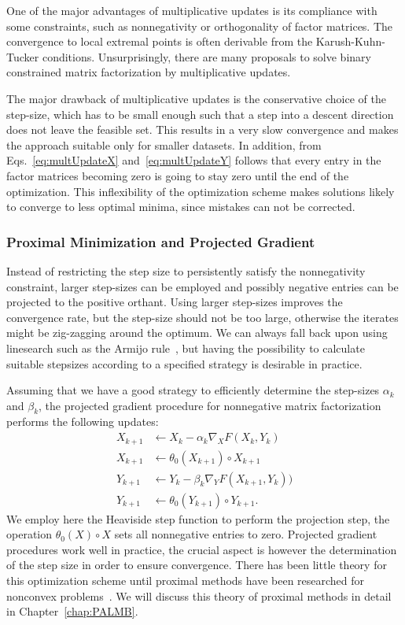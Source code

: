One of the major advantages of multiplicative updates is its compliance with some constraints, such as nonnegativity or orthogonality of factor matrices. The  convergence to local extremal points is often derivable from the Karush-Kuhn-Tucker conditions. Unsurprisingly, there are many proposals to solve binary constrained matrix factorization by multiplicative updates.  

The major drawback of multiplicative updates is the conservative choice of the step-size, which has to be small enough such that a step into a descent direction does not leave the feasible set. This results in a very slow convergence and makes the approach suitable only for smaller datasets. In addition, from Eqs.~\eqref{eq:multUpdateX} and~\eqref{eq:multUpdateY} follows that every entry in the factor matrices becoming zero is going to stay zero until the end of the optimization. This inflexibility of the optimization scheme makes solutions likely to converge to less optimal minima, since mistakes can not be corrected. 
%
\subsubsection{Proximal Minimization and Projected Gradient} \label{sec:ZS:ProxNMF}
Instead of restricting the step size to persistently satisfy the nonnegativity constraint, larger step-sizes can be employed and possibly negative entries can be projected to the positive orthant. Using larger step-sizes improves the convergence rate, but the step-size should not be too large, otherwise the iterates might be zig-zagging around the optimum. We can always fall back upon using linesearch such as the Armijo rule~\citep{lin2007projected}, but having the possibility to calculate suitable stepsizes according to a specified strategy is desirable in practice.  

Assuming that we have a good strategy to efficiently determine the step-sizes $\alpha_k$ and $\beta_k$, the projected gradient procedure for nonnegative matrix factorization performs the following updates:
\begin{align*}
X_{k+1}&\gets X_k-\alpha_k\nabla_XF(X_k,Y_k) \\
X_{k+1}&\gets \theta_0(X_{k+1})\circ X_{k+1}\\
Y_{k+1}&\gets Y_k-\beta_k\nabla_YF(X_{k+1},Y_k))\\
Y_{k+1}&\gets \theta_0(Y_{k+1})\circ Y_{k+1}.
\end{align*}
We employ here the Heaviside step function to perform the projection step, the operation $\theta_0(X)\circ X$ sets all nonnegative entries to zero. Projected gradient procedures work well in practice, the crucial aspect is however the determination of the step size in order to ensure convergence. There has been little theory for this optimization scheme until proximal methods have been researched for nonconvex problems~\cite{bolte2014proximal}. We will discuss this theory of proximal methods in detail in Chapter~\ref{chap:PALMB}.

